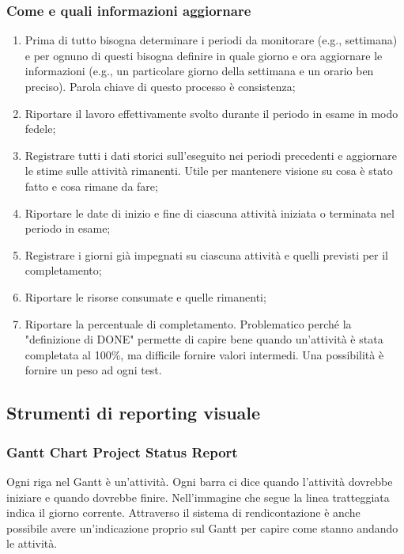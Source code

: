 \subsubsection{Come e quali informazioni aggiornare}
\begin{enumerate}
	\item Prima di tutto bisogna determinare i periodi da monitorare (e.g., settimana) e per ognuno di questi bisogna definire in quale giorno e ora aggiornare le informazioni (e.g., un particolare giorno della settimana e un orario ben preciso). Parola chiave di questo processo è consistenza;
	\item Riportare il lavoro effettivamente svolto durante il periodo in esame in modo fedele;
	\item Registrare tutti i dati storici sull’eseguito nei periodi precedenti e aggiornare le stime sulle attività rimanenti. Utile per mantenere visione su cosa è stato fatto e cosa rimane da fare;
	\item Riportare le date di inizio e fine di ciascuna attività iniziata o terminata nel periodo in esame;
	\item Registrare i giorni già impegnati su ciascuna attività e quelli previsti per il completamento;
	\item Riportare le risorse consumate e quelle rimanenti;
	\item Riportare la percentuale di completamento. Problematico perché la "definizione di DONE" permette di capire bene quando un'attività è stata completata al 100\%, ma difficile fornire valori intermedi. Una possibilità è fornire un peso ad ogni test.
\end{enumerate}

\subsection{Strumenti di reporting visuale}

\subsubsection{Gantt Chart Project Status Report}
Ogni riga nel Gantt è un'attività. Ogni barra ci dice quando l'attività dovrebbe iniziare e quando dovrebbe finire. Nell'immagine che segue la linea tratteggiata indica il giorno corrente. Attraverso il sistema di rendicontazione è anche possibile avere un'indicazione proprio sul Gantt per capire come stanno andando le attività.

